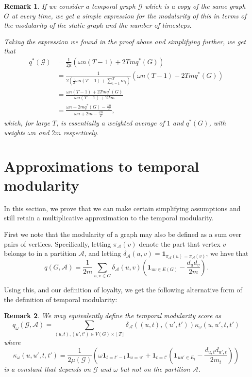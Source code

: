 \documentclass[runningheads]{llncs}
\newtheorem{rmk}{Remark}
\newcommand{\cA}{\mathcal{A}}
\newcommand{\cG}{\mathcal{G}}
\newcommand{\ind}[1]{\mathbf{1}_{#1}}
\begin{document}
\begin{rmk}
    If we consider a temporal graph $\cG$ which is a copy of the same graph $G$ at every time, we get a simple expression for the modularity of this in terms of the modularity of the static graph and the number of timesteps.

    Taking the expression we found in the proof above and simplifying further, we get that
    \begin{align*}
        q^*(\cG) &= \frac{1}{2\mu}\left(\omega n(T-1) + 2Tmq^*(G)\right)\\
        &= \frac{1}{2\left(\frac{1}{2}\omega n(T-1) + \sum_{t=1}^T m_t\right)}\left(\omega n(T-1) + 2Tmq^*(G)\right)\\
        &= \frac{\omega n(T-1) + 2Tmq^*(G)}{\omega n(T-1) + 2Tm}\\
        &= \frac{\omega n + 2mq^*(G) - \frac{\omega n}{T}}{\omega n + 2m - \frac{\omega n}{T}},
    \end{align*}
    which, for large $T$, is essentially a weighted average of $1$ and $q^*(G)$, with weights $\omega n$ and $2m$ respectively.
\end{rmk}



\section{Approximations to temporal modularity}\label{sec:approx}

In this section, we prove that we can make certain simplifying assumptions and still retain a multiplicative approximation to the temporal modularity.

First we note that the modularity of a graph may also be defined as a sum over pairs of vertices. Specifically, letting $\pi_\cA(v)$ denote the part that vertex $v$ belongs to in a partition $\cA$, and letting $\delta_\cA(u,v) = \ind{\pi_\cA(u) = \pi_\cA(v)}$, we have that
$$q(G, \cA) = \frac{1}{2m} \sum_{u,v \in G} \delta_\cA(u,v)\left(\ind{uv \in E(G)} - \frac{d_u d_v}{2m}\right).$$

Using this, and our definition of loyalty, we get the following alternative form of the definition of temporal modularity:

\begin{rmk}\label{remark:sum_form_def_tempmod}
    We may equivalently define the temporal modularity score as
    \begin{equation} \label{eqn:sum_form_def_tempmod}
        q_\omega(\cG,\cA) = \sum_{(u,t), (u', t') \in V(G)\times[T]} \delta_\cA((u,t),(u',t')) \kappa_\omega(u,u',t,t')
    \end{equation}
    where
    $$\kappa_\omega(u,u',t,t') = \frac{1}{2\mu(\cG)}\left(\omega\ind{t = t'-1}\ind{u = u'} + \ind{t = t'}\left(\ind{uu' \in E_t} - \frac{d_{u,t} d_{u',t}}{2m_t}\right)\right)$$
    is a constant that depends on $\cG$ and $\omega$ but not on the partition $\cA$.
\end{rmk}
\end{document}
